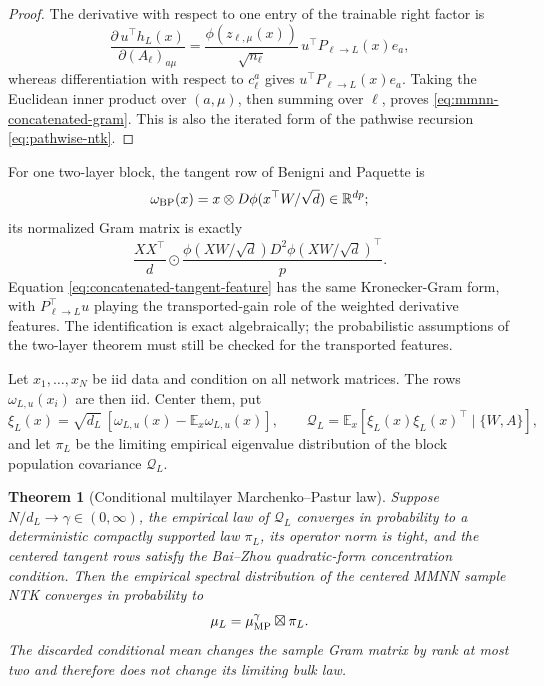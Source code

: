 \documentclass{article}
\newtheorem{theorem}{Theorem}[section]
\newcommand{\E}{\mathbb E}
\newcommand{\R}{\mathbb R}
\begin{document}
\begin{proof}
The derivative with respect to one entry of the trainable right factor is
\[
\frac{\partial\,u^\top h_L(x)}{\partial(A_\ell)_{a\mu}}
=\frac{\phi(z_{\ell,\mu}(x))}{\sqrt{n_\ell}}\,
u^\top P_{\ell\to L}(x)e_a,
\]
whereas differentiation with respect to \(c_\ell^a\) gives
\(u^\top P_{\ell\to L}(x)e_a\).  Taking the Euclidean inner product over
\((a,\mu)\), then summing over \(\ell\), proves
\eqref{eq:mmnn-concatenated-gram}.  This is also the iterated form of the
pathwise recursion \eqref{eq:pathwise-ntk}.
\end{proof}

For one two-layer block, the tangent row of Benigni and Paquette
\citep{BenigniPaquette2025} is
\begin{equation}
\omega_{\rm BP}(x)
=x\otimes D\phi(x^\top W/\sqrt d)\in\R^{dp};
\label{eq:bp-tangent-row}
\end{equation}
its normalized Gram matrix is exactly
\[
\frac{XX^\top}{d}\odot
\frac{\phi(XW/\sqrt d)D^2\phi(XW/\sqrt d)^\top}{p}.
\]
Equation \eqref{eq:concatenated-tangent-feature} has the same Kronecker-Gram
form, with \(P_{\ell\to L}^\top u\) playing the transported-gain role of the
weighted derivative features.  The identification is exact algebraically;
the probabilistic assumptions of the two-layer theorem must still be checked
for the transported features.

Let \(x_1,\ldots,x_N\) be iid data and condition on all network matrices.
The rows \(\omega_{L,u}(x_i)\) are then iid.  Center them, put
\[
\xi_L(x)=\sqrt{d_L}\,[\omega_{L,u}(x)
-\E_x\omega_{L,u}(x)],
\qquad
\mathcal Q_L=\E_x[\xi_L(x)\xi_L(x)^\top\mid\{W,A\}],
\]
and let \(\pi_L\) be the limiting empirical eigenvalue distribution of the
block population covariance \(\mathcal Q_L\).

\begin{theorem}[Conditional multilayer Marchenko--Pastur law]
\label{thm:mmnn-bp-law}
Suppose \(N/d_L\to\gamma\in(0,\infty)\), the empirical law of
\(\mathcal Q_L\) converges in probability to a deterministic compactly
supported law \(\pi_L\), its operator norm is tight, and the centered tangent
rows satisfy the Bai--Zhou quadratic-form concentration condition.  Then the
empirical spectral distribution of the centered MMNN sample NTK converges in
probability to
\begin{equation}
\mu_L=\mu_{\rm MP}^{\gamma}\boxtimes\pi_L.
\label{eq:mmnn-bp-law}
\end{equation}
The discarded conditional mean changes the sample Gram matrix by rank at
most two and therefore does not change its limiting bulk law.
\end{theorem}
\end{document}
